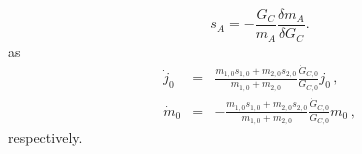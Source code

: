 \documentclass[prd,twocolumn,nofootinbib]{revtex4-1}
\begin{document}
\begin{equation}
s_A=-\frac{G_C}{m_A}\frac{\delta m_A}{\delta G_C}.
\end{equation}
as~\cite{PhysRevLett.65.953}
\begin{eqnarray}\label{eq:3.7a4-3}
\dot{j}_0&=&\frac{m_{1,0}s_{1,0}+m_{2,0}s_{2,0}}{m_{1,0}+m_{2,0}}\frac{\dot{G}_{C,0}}{G_{C,0}}j_0\,, \\
\label{eq:3.7a4-4}
\dot{m}_0&=&-\frac{m_{1,0}s_{1,0}+m_{2,0}s_{2,0}}{m_{1,0}+m_{2,0}}\frac{\dot{G}_{C,0}}{G_{C,0}}m_0\,,
\end{eqnarray}
respectively. 
\end{document}
